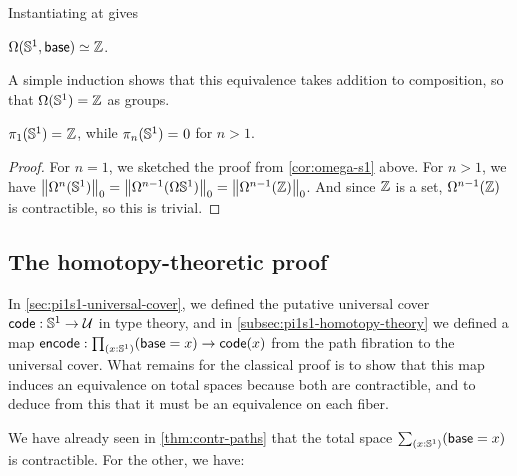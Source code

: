 Instantiating at {\base} gives
\begin{cor}\label{cor:omega-s1}
$\eqv {\Omega(\Sn^1,\base)} {\Z}$.
\end{cor}

A simple induction shows that this equivalence takes addition to
composition, so that $\Omega(\Sn ^1) = \Z$ as groups.

\begin{cor} \label{cor:pi1s1}
$\id{\pi_1(\Sn ^1)} {\Z}$, while $\id{\pi_n(\Sn ^1)}0$ for $n>1$.
\end{cor}
\begin{proof}
For $n=1$, we sketched the proof from \autoref{cor:omega-s1} above.
For $n > 1$, we have $\trunc 0 {\Omega^{n}(\Sn ^1)} = \trunc 0 {\Omega^{n-1}(\Omega{\Sn ^1})} = \trunc 0 {\Omega^{n-1}(\Z)}$.
And since $\Z$ is a set, $\Omega^{n-1}(\Z)$ is contractible, so this is trivial.
\end{proof}


\subsection{The homotopy-theoretic proof}
\label{subsec:pi1s1-homotopy-theory}

In \autoref{sec:pi1s1-universal-cover}, we defined the putative universal cover $\code:\Sn^1\to\type$ in type theory, and in \autoref{subsec:pi1s1-homotopy-theory} we defined a map $\encode : \prd{x:\Sn^1} (\base=x) \to \code(x)$ from the path fibration to the universal cover.
What remains for the classical proof is to show that this map induces an equivalence on total spaces because both are contractible, and to deduce from this that it must be an equivalence on each fiber.

We have already seen in \autoref{thm:contr-paths} that the total space $\sm{x:\Sn^1} (\base=x)$ is contractible.
For the other, we have:

